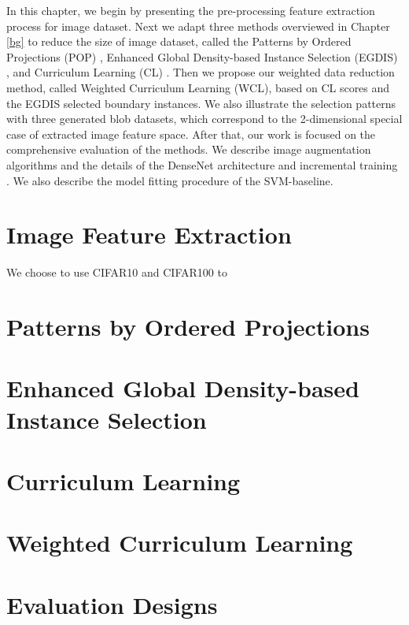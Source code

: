 In this chapter, we begin by presenting the pre-processing feature extraction process for image dataset. Next we adapt three methods overviewed in Chapter \ref{bg} to reduce the size of image dataset, called the Patterns by Ordered Projections (POP) \cite{Riquelme2003a}, Enhanced Global Density-based Instance Selection (EGDIS) \cite{Malhat2020}, and Curriculum Learning (CL) \cite{Hacohen2019a}. Then we propose our weighted data reduction method, called Weighted Curriculum Learning (WCL), based on CL scores and the EGDIS selected boundary instances. We also illustrate the selection patterns with three generated blob datasets, which correspond to the 2-dimensional special case of extracted image feature space. After that, our work is focused on the comprehensive evaluation of the methods. We describe image augmentation algorithms and the details of the DenseNet architecture \cite{Huang2017} and incremental training \cite{Istrate2017}. We also describe the model fitting procedure of the SVM-baseline.

\section{Image Feature Extraction}
We choose to use CIFAR10 and CIFAR100 to 

\section{Patterns by Ordered Projections}

\section{Enhanced Global Density-based Instance Selection}
\section{Curriculum Learning}
\section{Weighted Curriculum Learning}
\section{Evaluation Designs}